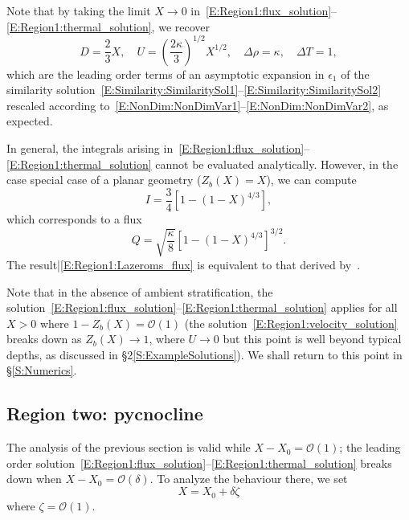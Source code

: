 \documentclass[openacc]{rsproca_new}%
\newcommand{\order}[1]{\mathcal{O}(#1)}
\newcommand{\epsone}{\epsilon_{1}} %
\newcommand{\lt}{\delta} %
\begin{document}
Note that by taking the limit $X \to 0$ in~\eqref{E:Region1:flux_solution}--\eqref{E:Region1:thermal_solution}, we recover 
\begin{equation}\label{E:Region1:dimensionless_similarity}
D = \frac{2}{3}X, \quad U = \left(\frac{2\kappa}{3}\right)^{1/2}X^{1/2}, \quad \Delta \rho = \kappa, \quad \Delta T = 1,
\end{equation} 
which are the leading order terms of an asymptotic expansion in $\epsone$ of the similarity solution~\eqref{E:Similarity:SimilaritySol1}--\eqref{E:Similarity:SimilaritySol2} rescaled according to~\eqref{E:NonDim:NonDimVar1}--\eqref{E:NonDim:NonDimVar2}, as expected.

In general, the integrals arising in~\eqref{E:Region1:flux_solution}--\eqref{E:Region1:thermal_solution} cannot be evaluated analytically. However, in the case special case of a planar geometry ($Z_b(X) = X$), we can compute
\begin{equation}
    I = \frac{3}{4}\left[1 - (1 - X)^{4/3}\right],
\end{equation}
which corresponds to a flux
\begin{equation}\label{E:Region1:Lazeroms_flux}
Q =  \sqrt{\frac{\kappa}{8}}\left[1 - (1-X)^{4/3}\right]^{3/2}.
\end{equation}
The result|\eqref{E:Region1:Lazeroms_flux} is equivalent to that derived by~\cite{Lazeroms2019JPhysOcean}.

Note that in the absence of ambient stratification, the solution~\eqref{E:Region1:flux_solution}--\eqref{E:Region1:thermal_solution} applies for all $X> 0$ where $1 - Z_b(X) = \mathcal{O}(1)$ (the solution~\eqref{E:Region1:velocity_solution} breaks down as $Z_b(X) \to 1$, where $U \to 0$ but this point is well beyond typical depths, as discussed in \S2\ref{S:ExampleSolutions}). We shall return to this point in \S\ref{S:Numerics}.

\subsection{Region two: pycnocline}\label{S:Asymptotics:Region2}
The analysis of the previous section is valid while $X - X_0 = \mathcal{O}(1)$; the leading order solution~\eqref{E:Region1:flux_solution}--\eqref{E:Region1:thermal_solution} breaks down when $X - X_0 = \order{\delta}$. To analyze the behaviour there, we set
\begin{equation}\label{E:pycnocline:length_scaling}
X = X_0 + \lt \zeta
\end{equation}
where $\zeta = \mathcal{O}(1)$. 
\end{document}

